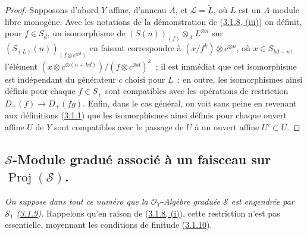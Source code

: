 \begin{proof}
Supposons d'abord $Y$ affine, d'anneau $A$, et
$\mathcal{L}=\widetilde{L}$, où $L$ est un $A$-module libre monogène. Avec les
notations de la démonstration de
(\hyperref[II.3.1.8-fr]{3.1.8, (iii)}) on définit, pour $f\in S_d$, un
isomorphisme de $(S(n))_{(f)}\otimes_A L^{\otimes n}$ sur
$(S_{(L)}(n))_{(f\otimes c^{\otimes d})}$ en faisant correspondre à
$(x/f^k)\otimes c^{\otimes n}$, où $x\in S_{kd+n}$, l'élément
$(x\otimes c^{\otimes(n+kd)})/(f\otimes c^{\otimes d})^k$~; il est immédiat
que cet isomorphisme est indépendant du générateur $c$ choisi pour $L$~; en
outre, les isomorphismes ainsi définis pour chaque $f\in S_+$ sont compatibles
avec les opérations de restriction $D_+(f)\to D_+(fg)$. Enfin, dans le cas
général, on voit sans peine en revenant aux définitions
(\hyperref[II.3.1.1-fr]{3.1.1}) que les isomorphismes ainsi définis pour
chaque ouvert affine $U$ de $Y$ sont compatibles avec le passage de $U$ à un
ouvert affine $U'\subset U$.
\end{proof}

\subsection{$\mathcal{S}$-Module gradué associé à un faisceau sur
$\operatorname{Proj}(\mathcal{S})$.}
\label{subsection:II.3.3-fr}

\emph{On suppose dans tout ce numéro que la $\mathcal{O}_Y$-Algèbre graduée
$\mathcal{S}$ est engendrée par $\mathcal{S}_1$
(\hyperref[II.3.1.9-fr]{3.1.9}).} Rappelons qu'en raison de
(\hyperref[II.3.1.8-fr]{3.1.8, (i)}), cette restriction n'est pas essentielle,
moyennant les conditions de finitude (\hyperref[II.3.1.10-fr]{3.1.10}).

